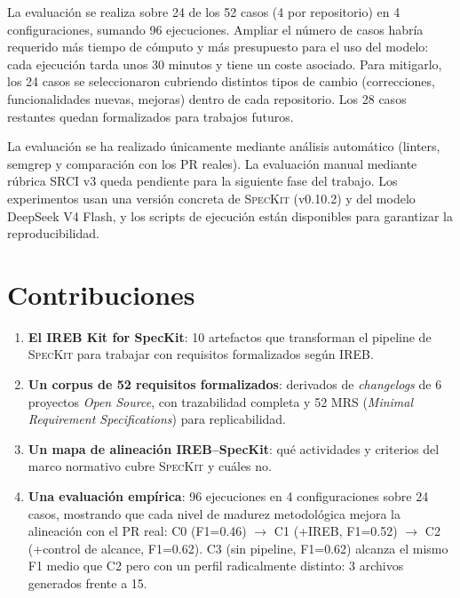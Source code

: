 La evaluaci\'on se realiza sobre 24 de los 52 casos (4 por repositorio) en 4 configuraciones, sumando 96 ejecuciones. Ampliar el n\'umero de casos habr\'ia requerido m\'as tiempo de c\'omputo y m\'as presupuesto para el uso del modelo: cada ejecuci\'on tarda unos 30 minutos y tiene un coste asociado. Para mitigarlo, los 24 casos se seleccionaron cubriendo distintos tipos de cambio (correcciones, funcionalidades nuevas, mejoras) dentro de cada repositorio. Los 28 casos restantes quedan formalizados para trabajos futuros.

La evaluaci\'on se ha realizado \'unicamente mediante an\'alisis autom\'atico (linters, semgrep y comparaci\'on con los PR reales). La evaluaci\'on manual mediante r\'ubrica SRCI v3 queda pendiente para la siguiente fase del trabajo. Los experimentos usan una versi\'on concreta de \textsc{SpecKit} (v0.10.2) y del modelo DeepSeek V4 Flash, y los scripts de ejecuci\'on est\'an disponibles para garantizar la reproducibilidad.

\section{Contribuciones}

\begin{enumerate}
    \item \textbf{El IREB Kit for SpecKit}: 10 artefactos que transforman el pipeline de \textsc{SpecKit} para trabajar con requisitos formalizados seg\'un IREB.
    \item \textbf{Un corpus de 52 requisitos formalizados}: derivados de \emph{changelogs} de 6 proyectos \emph{Open Source}, con trazabilidad completa y 52 MRS (\emph{Minimal Requirement Specifications}) para replicabilidad.
    \item \textbf{Un mapa de alineaci\'on IREB--SpecKit}: qu\'e actividades y criterios del marco normativo cubre \textsc{SpecKit} y cu\'ales no.
    \item \textbf{Una evaluaci\'on emp\'irica}: 96 ejecuciones en 4 configuraciones sobre 24 casos, mostrando que cada nivel de madurez metodol\'ogica mejora la alineaci\'on con el PR real: C0 (F1=0.46) $\rightarrow$ C1 (+IREB, F1=0.52) $\rightarrow$ C2 (+control de alcance, F1=0.62). C3 (sin pipeline, F1=0.62) alcanza el mismo F1 medio que C2 pero con un perfil radicalmente distinto: 3 archivos generados frente a 15.
\end{enumerate}

